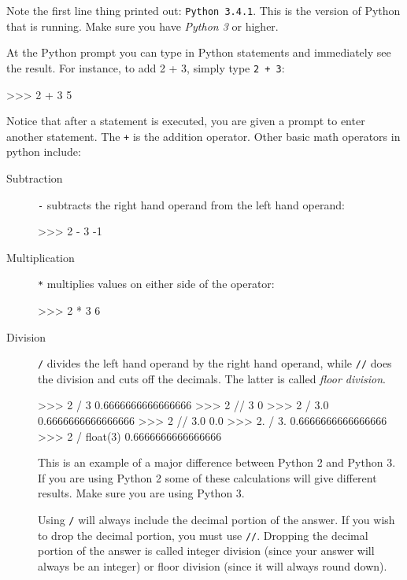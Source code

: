 \documentclass[11pt]{cselabheader}
\begin{document}
Note the first line thing printed out: \texttt{Python 3.4.1}. This is the
version of Python that is running. Make sure you have \emph{Python 3} or higher.

At the Python prompt \pyconinline{>>>} you can type in Python statements and
immediately see the result. For instance, to add 2 + 3, simply type \texttt{2 +
3}: 

\begin{pyconcode}
>>> 2 + 3
5
\end{pyconcode}

Notice that after a statement is executed, you are given a prompt to enter
another statement. The \texttt{+} is the addition operator. Other basic math
operators in python include:

\begin{description}
  \item[Subtraction] \texttt{-} subtracts the right hand operand from the left
    hand operand:

    \begin{pyconcode}
>>> 2 - 3
-1
    \end{pyconcode}

  \item[Multiplication] \texttt{*} multiplies values on either side of the
    operator:

    \begin{pyconcode}
>>> 2 * 3
6
    \end{pyconcode}

  \item[Division] \texttt{/} divides the left hand operand by the right hand
    operand, while \texttt{//} does the division and cuts off the decimals. The
    latter is called \emph{floor division}.

  \begin{pyconcode}
>>> 2 / 3
0.6666666666666666
>>> 2 // 3
0
>>> 2 / 3.0
0.6666666666666666
>>> 2 // 3.0
0.0
>>> 2. / 3.
0.6666666666666666
>>> 2 / float(3)
0.6666666666666666
  \end{pyconcode}

    This is an example of a major difference between Python 2 and Python 3. If
    you are using Python 2 some of these calculations will give different
    results. Make sure you are using Python 3.

    Using \texttt{/} will always include the decimal portion of the answer. If
    you wish to drop the decimal portion, you must use \texttt{//}. Dropping the
    decimal portion of the answer is called integer division (since your answer
    will always be an integer) or floor division (since it will always round
    down).


\end{description}
\end{document}
